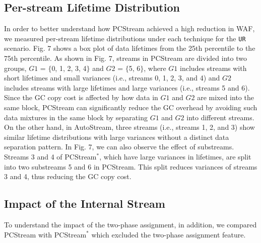 \subsection{Per-stream Lifetime Distribution}

In order to better understand how \textsf{\small PCStream} achieved a high reduction in WAF, 
we measured per-stream lifetime distributions under each technique for the \texttt{UR} scenario.
Fig. 7 shows a box plot of data lifetimes from the 25th percentile to the 75th percentile.
As shown in Fig. 7, 
streams in \textsf{\small PCStream} are divided into two groups, 
$G1$ = $\{$0, 1, 2, 3, 4$\}$ and $G2$ = $\{$5, 6$\}$, 
where $G1$ includes streams with short lifetimes and small variances (i.e., streams 0, 1, 2, 3, and 4) 
and $G2$ includes streams with large lifetimes and large variances (i.e., streams 5 and 6).  
Since the GC copy cost is affected by how data in $G1$ and $G2$ are mixed into the same block, 
\textsf{\small PCStream} can significantly reduce the GC overhead 
by avoiding such data mixtures in the same block by separating $G1$ and $G2$ into different streams. 
On the other hand, in \textsf{\small AutoStream}, 
three streams (i.e., streams 1, 2, and 3) show similar lifetime distributions with large variances 
without a distinct data separation pattern.
In Fig. 7, we can also observe the effect of substreams.  
Streams 3 and 4 of \textsf{\small PCStream$^{*}$}, 
which have large variances in lifetimes, are split into two substreams 5 and 6 in \textsf{\small PCStream}.
This split reduces variances of streams 3 and 4, thus reducing the GC copy cost.  

\subsection{Impact of the Internal Stream}
To understand the impact of the
two-phase assignment, in addition, we compared \textsf{\small PCStream} with
\textsf{\small PCStream$^{*}$} which excluded the two-phase assignment feature.

